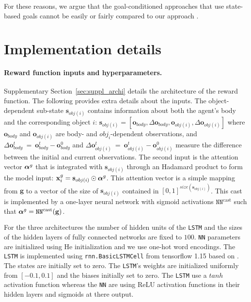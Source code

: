 For these reasons, we argue that the goal-conditioned approaches that use state-based goals cannot be easily or fairly compared to our approach \imagine.



\clearpage
\section{Implementation details}
\label{sec:supp_impl_details}



\paragraph{Reward function inputs and hyperparameters.} Supplementary Section~\ref{sec:suppl_archi} details the architecture of the reward function. The following provides extra details about the inputs. The object-dependent sub-state $\mathbf{s}_{obj(i)}$ contains information about both the agent's body and the corresponding object $i$:  $\mathbf{s}_{obj(i)}=[\mathbf{o}_{body}, \Delta{\mathbf{o}_{body}}, \mathbf{o}_{obj(i)}, \Delta{\mathbf{o}_{obj(i)}}]$ where $\mathbf{o}_{body}$ and $\mathbf{o}_{obj(i)}$ are body- and $obj_i$-dependent observations, and $\Delta{\mathbf{o}^t_{body}}~=~\mathbf{o}_{body}^t-\mathbf{o}_{body}^0$ and $\Delta{\mathbf{o}^t_{obj(i)}}~=~\mathbf{o}_{obj(i)}^t-\mathbf{o}_{obj(i)}^0$ measure the difference between the initial and current observations. The second input is the attention vector $\boldsymbol{\alpha}^g$ that is integrated with $\mathbf{s}_{obj(i)}$ through an Hadamard product to form the model input: $\mathbf{x}_i^g=\mathbf{s}_{obj(i)} \odot \boldsymbol{\alpha}^g$. This attention vector is a simple mapping from $\textbf{g}$ to a vector of the size of $\mathbf{s}_{obj(i)}$ contained in $[0,1]^{size(\mathbf{s}_{obj(i)})}$. This cast is implemented by a one-layer neural network with sigmoid activations $\texttt{NN}^\text{cast}$ such that $\boldsymbol{\alpha}^g=\texttt{NN}^\text{cast}(\mathbf{g})$.

For the three architectures the number of hidden units of the \texttt{LSTM} and the sizes of the hidden layers of fully connected networks are fixed to $100$. \texttt{NN} parameters are initialized using He initialization \cite{he} and we use one-hot word encodings. The \texttt{LSTM} is implemented using \texttt{rnn.BasicLSTMCell} from tensorflow 1.15 based on \citet{zaremba2014recurrent}. The states are initially set to zero. The \texttt{LSTM}'s weights are initialized uniformly from $[-0.1,0.1]$ and the biases initially set to zero. The \texttt{LSTM} use a $tanh$ activation function whereas the \texttt{NN} are using ReLU activation functions in their hidden layers and sigmoids at there output.

